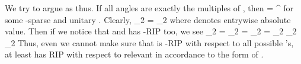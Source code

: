 We try to argue as thus.
If all angles  are exactly the multiples of , then
 {
\NC {}
=\NC {}    ^\Adj \NR
}
for some -sparse  and unitary .
Clearly,
 {
\NC {} _2
\NC = _2 \NR
}
where  denotes entrywise absolute value.
Then if we notice that  and  has -RIP too, we see
 {
\NC \NC {} _2 \NR
%
\NC =\NC {} _2 \NR
%
\NC =\NC {} _2 \NR
%
\NC =\NC {} _2 \D
    _2 \NR
%
\NC \eqsim \NC {} _2  \NR
}
Thus, even we cannot make sure that  is -RIP with respect to all possible 's, at least  has RIP with respect to relevant  in accordance to the form of .

\stopsubsection

\stopsection
